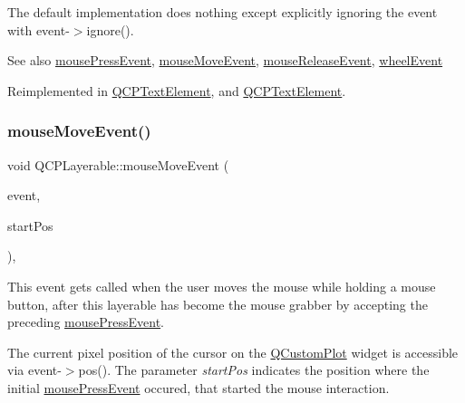 The default implementation does nothing except explicitly ignoring the event with {\ttfamily event-\/$>$ignore()}.

\begin{DoxySeeAlso}{See also}
\hyperlink{class_q_c_p_layerable_af6567604818db90f4fd52822f8bc8376}{mouse\+Press\+Event}, \hyperlink{class_q_c_p_layerable_a9eee1ba47fd69be111059ca3881933e4}{mouse\+Move\+Event}, \hyperlink{class_q_c_p_layerable_aa0d79b005686f668622bbe66ac03ba2c}{mouse\+Release\+Event}, \hyperlink{class_q_c_p_layerable_a47dfd7b8fd99c08ca54e09c362b6f022}{wheel\+Event} 
\end{DoxySeeAlso}


Reimplemented in \hyperlink{class_q_c_p_text_element_a2272ff775ab385f612e9fd39773de7c0}{Q\+C\+P\+Text\+Element}, and \hyperlink{class_q_c_p_text_element_a45dcc9c527018f879c28b0d61b57147f}{Q\+C\+P\+Text\+Element}.

\mbox{\label{class_q_c_p_layerable_a9eee1ba47fd69be111059ca3881933e4}} 
\subsubsection{\texorpdfstring{mouse\+Move\+Event()}{mouseMoveEvent()}}
{\footnotesize\ttfamily void Q\+C\+P\+Layerable\+::mouse\+Move\+Event (\begin{DoxyParamCaption}\item[{Q\+Mouse\+Event $\ast$}]{event,  }\item[{const Q\+PointF \&}]{start\+Pos }\end{DoxyParamCaption})\hspace{0.3cm}{\ttfamily [protected]}, {\ttfamily [virtual]}}

This event gets called when the user moves the mouse while holding a mouse button, after this layerable has become the mouse grabber by accepting the preceding \hyperlink{class_q_c_p_layerable_af6567604818db90f4fd52822f8bc8376}{mouse\+Press\+Event}.

The current pixel position of the cursor on the \hyperlink{class_q_custom_plot}{Q\+Custom\+Plot} widget is accessible via {\ttfamily event-\/$>$pos()}. The parameter {\itshape start\+Pos} indicates the position where the initial \hyperlink{class_q_c_p_layerable_af6567604818db90f4fd52822f8bc8376}{mouse\+Press\+Event} occured, that started the mouse interaction.

